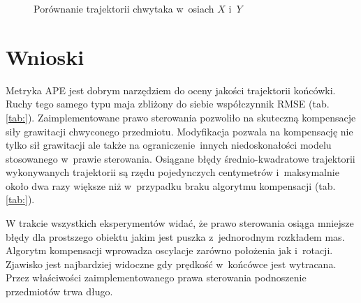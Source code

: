\begin{figure}[H]
	\centering
	\hfill
	\caption{Porównanie trajektorii chwytaka w~osiach $X$ i~$Y$}
	\label{fig:obrt_porow_przedm_bok}
\end{figure}


\section{Wnioski}

Metryka APE jest dobrym narzędziem do oceny jakości trajektorii końcówki. Ruchy tego samego typu maja zbliżony do siebie współczynnik RMSE (tab. \ref{tab:}). 
Zaimplementowane prawo sterowania pozwoliło na skuteczną kompensacje siły grawitacji chwyconego przedmiotu. Modyfikacja pozwala na kompensację nie tylko sił grawitacji ale także na ograniczenie innych niedoskonałości modelu stosowanego w~prawie sterowania. Osiągane błędy średnio-kwadratowe trajektorii wykonywanych trajektorii są rzędu pojedynczych centymetrów i~maksymalnie około dwa razy większe niż w~przypadku braku algorytmu kompensacji (tab. \ref{tab:}). 

W trakcie wszystkich eksperymentów widać, że prawo sterowania osiąga mniejsze błędy dla prostszego obiektu jakim jest puszka z~jednorodnym rozkładem mas. Algorytm kompensacji wprowadza oscylacje zarówno położenia jak i~rotacji. Zjawisko jest najbardziej widoczne gdy prędkość w~końcówce jest wytracana. Przez właściwości zaimplementowanego prawa sterowania podnoszenie przedmiotów trwa długo. 

